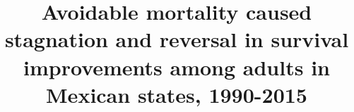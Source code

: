 \documentclass{bmcart}
\begin{document}
\begin{frontmatter}

\begin{fmbox}


\title{Avoidable mortality caused stagnation and reversal in survival improvements among adults in Mexican states, 1990-2015}


\author[
   addressref={aff1},                   %
   corref={aff1},                       %
   email={jmaburto@health.sdu.dk}   %
]{ }
\author[
   addressref={aff2},
   noteref={n1},
   email={riffe@demogr.mpg.de}
]{ }


\address[id=aff1]{%
  , %
  ,                     %
  ,                              %
}
\address[id=aff2]{%
  ,
  ,
  ,
}


\end{fmbox}
\end{frontmatter}
\end{document}

